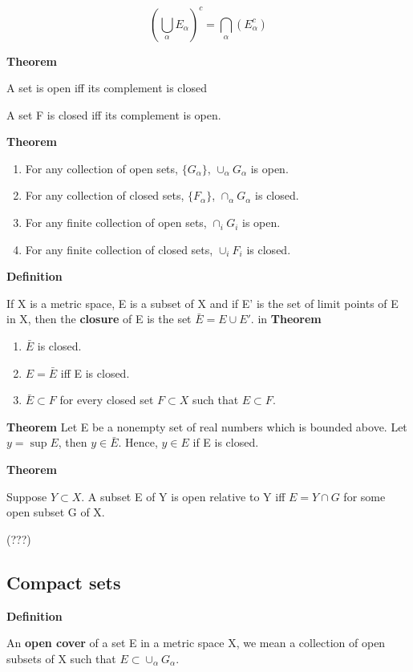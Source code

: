 \documentclass[11pt]{article}
\begin{document}
\[
\left(\bigcup_\alpha E_\alpha \right)^c = \bigcap_\alpha (E_\alpha^c)
\]


\textbf{Theorem}

A set is open iff its complement is closed

A set F is closed iff its complement is open.

\textbf{Theorem}

\begin{enumerate}
\item For any collection of open sets, \(\{G_\alpha\}\), \(\cup_\alpha G_\alpha\) is open.
\item For any collection of closed sets, \(\{F_\alpha\}\), \(\cap_\alpha G_\alpha\) is closed.
\item For any finite collection of open sets, \(\cap_i G_i\) is open.
\item For any finite collection of closed sets, \(\cup_i F_i\) is closed.
\end{enumerate}


\textbf{Definition}

If X is a metric space, E is a subset of X and if E' is the set of limit points of E in X, then the \textbf{closure} of E is the set \(\bar{E} = E \cup E'\).
in
\textbf{Theorem}

\begin{enumerate}
\item \(\bar{E}\) is closed.
\item \(E = \bar{E}\) iff E is closed.
\item \(\bar{E} \subset F\) for every closed set \(F \subset X\) such that \(E \subset F\).
\end{enumerate}


\textbf{Theorem}
Let E be a nonempty set of real numbers which is bounded above. Let \(y = \sup E\), then \(y \in \bar{E}\). Hence, \(y \in E\) if E is closed.

\textbf{Theorem}

Suppose \(Y \subset X\). A subset E of Y is open relative to Y iff \(E = Y \cap G\) for some open subset G of X.

(???)

\subsection{Compact sets}
\label{sec:org31168bd}

\textbf{Definition}

An \textbf{open cover} of a set E in a metric space X, we mean a collection of open subsets of X such that \(E \subset \cup_\alpha G_\alpha\).
\end{document}
